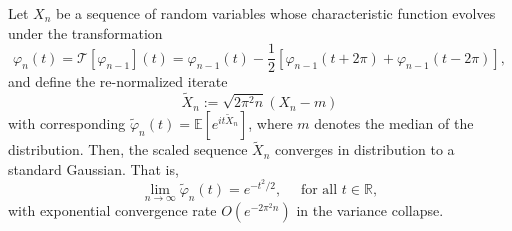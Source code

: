 \documentclass[10pt,a4paper]{amsart}
\begin{document}
\begin{theorem}
	Let $X_n$ be a sequence of random variables whose characteristic function evolves under the transformation
	\begin{equation}
		\varphi_n(t)=\mathcal{T}\left[\varphi_{n-1}\right](t)=\varphi_{n-1}(t)-\frac{1}{2}\left[\varphi_{n-1}(t+2 \pi )+\varphi_{n-1}(t-2 \pi)\right],
	\end{equation}
	and define the re-normalized iterate	
	$$
	\widetilde{X}_n:=\sqrt{2 \pi^2 n}\left(X_n-m\right)
	$$	
	with corresponding $\widetilde{\varphi}_n(t)=\mathbb{E}\left[e^{i t \widetilde{X}_n}\right]$, where $m$ denotes the median of the distribution.
	Then, the scaled sequence $\widetilde{X}_n$ converges in distribution to a standard Gaussian. That is,
	$$
	\lim _{n \rightarrow \infty} \widetilde{\varphi}_n(t)=e^{-t^2 / 2}, \quad \text { for all } t \in \mathbb{R},
	$$	
	with exponential convergence rate $O\left(e^{-2 \pi^2 n}\right)$ in the variance collapse.
\end{theorem}
\end{document}
